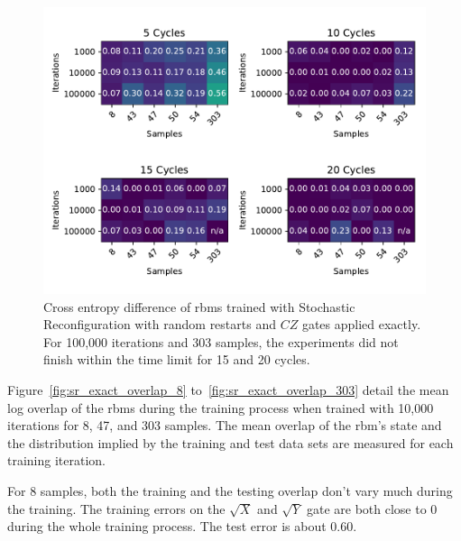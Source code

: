 \begin{figure}[H]
  \centering
  \includegraphics[width=\textwidth]{figures/results/sr-restarts-not-learned/fxeb_heatmap.pdf}
  \caption[Cross Entropy Difference of RBMs Trained with Stochastic Reconfiguration with Random Restarts and $CZ$ Gates Applied Exactly]{
  Cross entropy difference of \gls{rbm}s trained with Stochastic Reconfiguration with random restarts and $CZ$ gates applied exactly.
  For 100,000 iterations and 303 samples, the experiments did not finish within the time limit for 15 and 20 cycles.}
  \label{fig:sr_exact_fxeb}
\end{figure}

Figure~\ref{fig:sr_exact_overlap_8} to~\ref{fig:sr_exact_overlap_303} detail the mean log overlap of the \gls{rbm}s during the 
training process when trained with 10,000 iterations for 8, 47, and 303 samples. The 
mean overlap of the \gls{rbm}'s state and the distribution implied by the training and test data sets are measured 
for each training iteration.

For 8 samples, both the training and the testing overlap don't vary much during the training. The training errors on the $\sqrt{X}$ and 
$\sqrt{Y}$ gate are both close to 0 during the whole training process. The test error is about 0.60.

